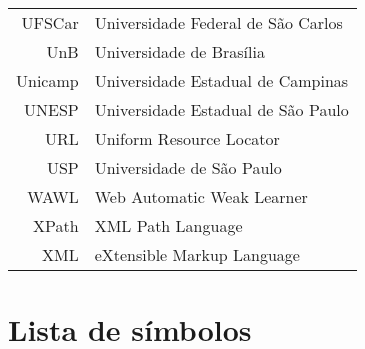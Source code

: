 \documentclass[12pt,twoside,brazilian]{book}
\begin{document}
\begin{tabular}{rl}
   UFSCar & Universidade Federal de São Carlos\\
   UnB & Universidade de Brasília\\
   Unicamp & Universidade Estadual de Campinas\\
   UNESP & Universidade Estadual de São Paulo\\
   URL & Uniform Resource Locator\\
   USP & Universidade de São Paulo\\
   WAWL & Web Automatic Weak Learner\\
   XPath & XML Path Language\\
   XML & eXtensible Markup Language
\end{tabular}

\chapter*{Lista de símbolos}
\end{document}
